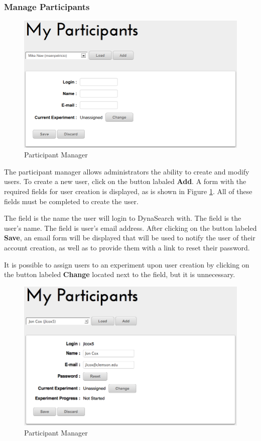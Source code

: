 \documentclass[article]{ij4uq}              %
\begin{document}
\subsubsection {Manage Participants}

\begin{figure}[h!]
 \centering
 \includegraphics[width=5.0in]{figures/manage_participants_new.png}
 \caption{Participant Manager}
 \label{fig:managePartNew}
\end{figure}
\FloatBarrier

The participant manager allows administrators the ability to create and modify users.  To create a new user, click on the button labaled \textbf{Add}.  A form with the required fields for user creation is displayed, as is shown in Figure \ref{fig:managePartNew}.  All of these fields must be completed to create the user.

The  field is the name the user will login to DynaSearch with.  The  field is the user's name. The  field is user's email address.  After clicking on the button labeled \textbf{Save}, an email form will be displayed that will be used to notify the user of their account creation, as well as to provide them with a link to reset their password.

It is possible to assign users to an experiment upon user creation by clicking on the button labeled \textbf{Change} located next to the  field, but it is unnecessary.

\begin{figure}[h!]
 \centering
 \includegraphics[width=5.0in]{figures/manage_participants.png}
 \caption{Participant Manager}
 \label{fig:managePart}
\end{figure}
\FloatBarrier
\end{document}

